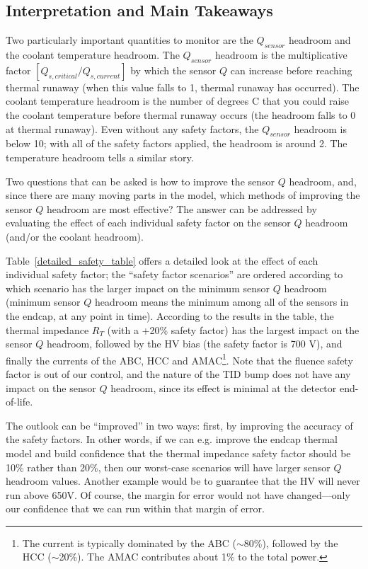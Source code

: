 \restoregeometry
\clearpage

\subsection{Interpretation and Main Takeaways}

Two particularly important quantities to monitor are the $Q_{sensor}$ headroom and the coolant
temperature headroom. The $Q_{sensor}$ headroom is the multiplicative factor
$[Q_{s,critical}/Q_{s,current}]$ by which the sensor $Q$ can increase before reaching thermal runaway
(when this value falls to 1, thermal runaway has occurred). The coolant temperature headroom is the
number of degrees C that you could raise the coolant temperature before thermal runaway occurs (the
headroom falls to 0 at thermal runaway). Even without any safety factors, the $Q_{sensor}$ headroom
is below 10; with all of the safety factors applied, the headroom is around 2. The temperature
headroom tells a similar story.

Two questions that can be asked is how to improve the sensor $Q$ headroom, and, since there are many
moving parts in the model, which methods of improving the sensor $Q$ headroom are most effective? The
answer can be addressed by evaluating the effect of each individual safety factor on the sensor $Q$
headroom (and/or the coolant headroom).

Table~\ref{detailed_safety_table} offers a detailed look at the effect of each individual safety
factor; the ``safety factor scenarios'' are ordered according to which scenario has the larger impact
on the minimum sensor $Q$ headroom (minimum sensor $Q$ headroom means the minimum among all of the sensors in
the endcap, at any point in time). According to the results in the table, the thermal impedance
$R_T$ (with a +20\% safety factor) has the largest impact on the sensor $Q$ headroom,
followed by the HV bias (the safety factor is 700 V), and finally the
currents of the ABC, HCC and AMAC\footnote{
The current is typically dominated by the ABC ($\sim$80\%), followed by the HCC ($\sim$20\%). The AMAC
contributes about 1\% to the total power.}.
Note that the fluence safety factor is out of our control, and the nature of the TID bump does not
have any impact on the sensor $Q$ headroom, since its effect is minimal at the detector end-of-life.

The outlook can be ``improved'' in two ways: first, by improving the accuracy of the safety factors.
In other words, if we can e.g. improve the endcap thermal model and build confidence that the thermal
impedance safety factor should be 10\% rather than 20\%, then our worst-case scenarios will have
larger sensor $Q$ headroom values. Another example would be to guarantee that the HV will never run
above 650V. Of course, the margin for error would not have changed---only our confidence that we can
run within that margin of error.

